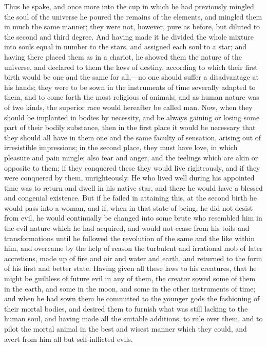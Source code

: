 \documentclass[11pt,letter]{article}
\begin{document}
\par  Thus he spake, and once more into the cup in which he had previously mingled the soul of the universe he poured the remains of the elements, and mingled them in much the same manner; they were not, however, pure as before, but diluted to the second and third degree. And having made it he divided the whole mixture into souls equal in number to the stars, and assigned each soul to a star; and having there placed them as in a chariot, he showed them the nature of the universe, and declared to them the laws of destiny, according to which their first birth would be one and the same for all,—no one should suffer a disadvantage at his hands; they were to be sown in the instruments of time severally adapted to them, and to come forth the most religious of animals; and as human nature was of two kinds, the superior race would hereafter be called man. Now, when they should be implanted in bodies by necessity, and be always gaining or losing some part of their bodily substance, then in the first place it would be necessary that they should all have in them one and the same faculty of sensation, arising out of irresistible impressions; in the second place, they must have love, in which pleasure and pain mingle; also fear and anger, and the feelings which are akin or opposite to them; if they conquered these they would live righteously, and if they were conquered by them, unrighteously. He who lived well during his appointed time was to return and dwell in his native star, and there he would have a blessed and congenial existence. But if he failed in attaining this, at the second birth he would pass into a woman, and if, when in that state of being, he did not desist from evil, he would continually be changed into some brute who resembled him in the evil nature which he had acquired, and would not cease from his toils and transformations until he followed the revolution of the same and the like within him, and overcame by the help of reason the turbulent and irrational mob of later accretions, made up of fire and air and water and earth, and returned to the form of his first and better state. Having given all these laws to his creatures, that he might be guiltless of future evil in any of them, the creator sowed some of them in the earth, and some in the moon, and some in the other instruments of time; and when he had sown them he committed to the younger gods the fashioning of their mortal bodies, and desired them to furnish what was still lacking to the human soul, and having made all the suitable additions, to rule over them, and to pilot the mortal animal in the best and wisest manner which they could, and avert from him all but self-inflicted evils.
\end{document}
